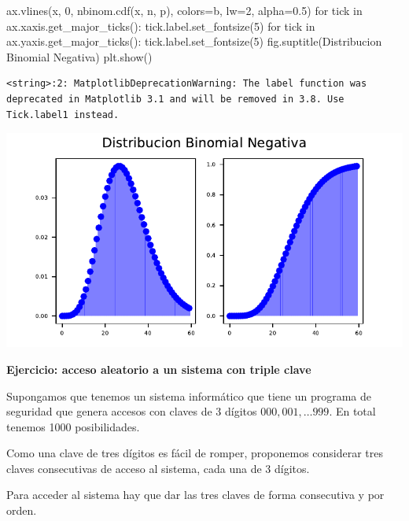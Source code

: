 \documentclass[
  letterpaper,
  DIV=11,
  numbers=noendperiod]{scrreprt}
\newenvironment{Shaded}{\begin{snugshade}}{\end{snugshade}}
\newcommand{\ControlFlowTok}[1]{\textcolor[rgb]{0.00,0.23,0.31}{#1}}
\newcommand{\DecValTok}[1]{\textcolor[rgb]{0.68,0.00,0.00}{#1}}
\newcommand{\FloatTok}[1]{\textcolor[rgb]{0.68,0.00,0.00}{#1}}
\newcommand{\KeywordTok}[1]{\textcolor[rgb]{0.00,0.23,0.31}{#1}}
\newcommand{\NormalTok}[1]{\textcolor[rgb]{0.00,0.23,0.31}{#1}}
\newcommand{\OperatorTok}[1]{\textcolor[rgb]{0.37,0.37,0.37}{#1}}
\newcommand{\StringTok}[1]{\textcolor[rgb]{0.13,0.47,0.30}{#1}}
\begin{document}
\begin{Shaded}
\begin{Highlighting}[]
\NormalTok{ax.vlines(x, }\DecValTok{0}\NormalTok{, nbinom.cdf(x, n, p), colors}\OperatorTok{=}\StringTok{\textquotesingle{}b\textquotesingle{}}\NormalTok{, lw}\OperatorTok{=}\DecValTok{2}\NormalTok{, alpha}\OperatorTok{=}\FloatTok{0.5}\NormalTok{)}
\ControlFlowTok{for}\NormalTok{ tick }\KeywordTok{in}\NormalTok{ ax.xaxis.get\_major\_ticks():}
\NormalTok{  tick.label.set\_fontsize(}\DecValTok{5}\NormalTok{)}
\ControlFlowTok{for}\NormalTok{ tick }\KeywordTok{in}\NormalTok{ ax.yaxis.get\_major\_ticks():}
\NormalTok{  tick.label.set\_fontsize(}\DecValTok{5}\NormalTok{)}
\NormalTok{fig.suptitle(}\StringTok{\textquotesingle{}Distribucion Binomial Negativa\textquotesingle{}}\NormalTok{)}
\NormalTok{plt.show()}
\end{Highlighting}
\end{Shaded}

\begin{verbatim}
<string>:2: MatplotlibDeprecationWarning: The label function was deprecated in Matplotlib 3.1 and will be removed in 3.8. Use Tick.label1 instead.
\end{verbatim}

\includegraphics{3_files/figure-pdf/negativa_py_show-1.pdf}

\textbf{Ejercicio: acceso aleatorio a un sistema con triple clave}

Supongamos que tenemos un sistema informático que tiene un programa de
seguridad que genera accesos con claves de 3 dígitos
\(000,001,\ldots 999\). En total tenemos 1000 posibilidades.

Como una clave de tres dígitos es fácil de romper, proponemos considerar
tres claves consecutivas de acceso al sistema, cada una de 3 dígitos.

Para acceder al sistema hay que dar las tres claves de forma consecutiva
y por orden.
\end{document}
